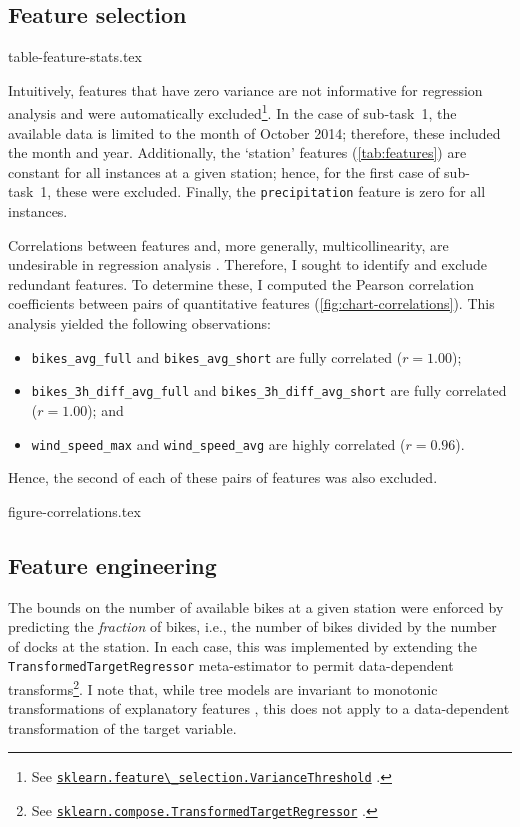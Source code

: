 \documentclass[11pt]{extarticle}
\newcommand{\sklearn}[1]{
  \href{https://scikit-learn.org/stable/modules/generated/sklearn.#1.html}{\lstinline|sklearn.#1|}
}
\newcommand{\windspeedmax}{wind\_speed\_max}
\newcommand{\windspeedavg}{wind\_speed\_avg}
\newcommand{\bikesavgfull}{bikes\_avg\_full}
\newcommand{\bikesavgshort}{bikes\_avg\_short}
\newcommand{\bikeshdiffavgfull}{bikes\_3h\_diff\_avg\_full}
\newcommand{\bikeshdiffavgshort}{bikes\_3h\_diff\_avg\_short}
\begin{document}
\subsection{Feature selection}
\label{sec:feature-selection}

{table-feature-stats.tex}

Intuitively, features that have zero variance are not informative for regression
analysis and were automatically
excluded\footnote{See \sklearn{feature\_selection.VarianceThreshold}.}.
In the case of sub-task~1, the available data is limited to the month of October 2014; therefore, these included the month and year.
Additionally, the `station' features (\cref{tab:features}) are constant for all
instances at a given station; hence, for the first case of sub-task~1, these were
excluded.
Finally, the \texttt{precipitation} feature is zero for all instances.

Correlations between features and, more generally, multicollinearity, are undesirable in regression analysis \parencite{Alin2010}.
Therefore, I sought to identify and exclude redundant features.
To determine these, I computed the Pearson correlation coefficients between pairs of quantitative features (\cref{fig:chart-correlations}).
This analysis yielded the following observations:
\begin{itemize}
  \item \texttt{\bikesavgfull} and \texttt{\bikesavgshort} are fully correlated ($r = 1.00$);
  \item \texttt{\bikeshdiffavgfull} and \texttt{\bikeshdiffavgshort} are fully correlated ($r  = 1.00$); and
  \item \texttt{\windspeedmax} and \texttt{\windspeedavg} are highly correlated ($r = 0.96$).
\end{itemize}
Hence, the second of each of these pairs of features was also excluded.

{figure-correlations.tex}

\subsection{Feature engineering}
\label{sec:feature-engineering}

The bounds on the number of available bikes at a given station were enforced by
predicting the \emph{fraction} of bikes, i.e., the number of bikes divided by the number
of docks at the station.
In each case, this was implemented by extending the \texttt{TransformedTargetRegressor}
meta-estimator to permit data-dependent
transforms\footnote{See \sklearn{compose.TransformedTargetRegressor}.}.
I note that, while tree models are invariant to monotonic transformations of explanatory
features \parencite[e.g.,][3184]{Death2000}, this does not apply to a data-dependent
transformation of the target variable.
\end{document}
